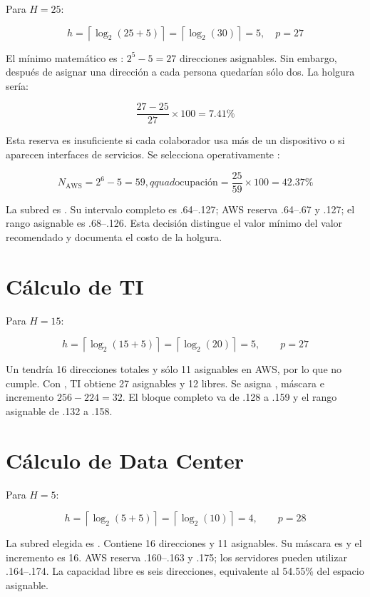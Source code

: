Para $H=25$:

\[
h=\left\lceil\log_2(25+5)\right\rceil
=\left\lceil\log_2(30)\right\rceil=5,
\quad p=27
\]

El mínimo matemático es : $2^5-5=27$ direcciones asignables. Sin embargo, después de asignar una dirección a cada persona quedarían sólo dos. La holgura sería:

\[
\frac{27-25}{27}\times100=7.41\%
\]

Esta reserva es insuficiente si cada colaborador usa más de un dispositivo o si aparecen interfaces de servicios. Se selecciona operativamente :

\[
N_{\mathrm{AWS}}=2^6-5=59,qquad
\text{ocupación}=\frac{25}{59}\times100=42.37\%
\]

La subred es . Su intervalo completo es .64--.127; AWS reserva .64--.67 y .127; el rango asignable es .68--.126. Esta decisión distingue el valor mínimo del valor recomendado y documenta el costo de la holgura.

\section{Cálculo de TI}

Para $H=15$:

\[
h=\left\lceil\log_2(15+5)\right\rceil
=\left\lceil\log_2(20)\right\rceil=5,
\qquad p=27
\]

Un  tendría 16 direcciones totales y sólo 11 asignables en AWS, por lo que no cumple. Con , TI obtiene 27 asignables y 12 libres. Se asigna , máscara  e incremento $256-224=32$. El bloque completo va de .128 a .159 y el rango asignable de .132 a .158.

\section{Cálculo de Data Center}

Para $H=5$:

\[
h=\left\lceil\log_2(5+5)\right\rceil
=\left\lceil\log_2(10)\right\rceil=4,
\qquad p=28
\]

La subred elegida es . Contiene 16 direcciones y 11 asignables. Su máscara es  y el incremento es 16. AWS reserva .160--.163 y .175; los servidores pueden utilizar .164--.174. La capacidad libre es seis direcciones, equivalente al 54.55\% del espacio asignable.

